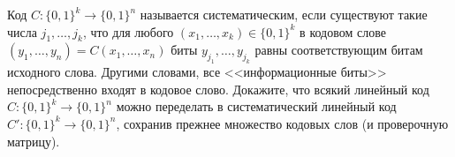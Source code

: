 Код $C: \{0, 1\}^k \rightarrow \{0, 1\}^n$ называется систематическим, если существуют такие числа $j_1, \dots, j_k$, что для
любого $(x_1, \dots, x_k) \in \{0, 1\}^k$ в кодовом слове $(y_1, \dots, y_n) = C(x_1, \dots, x_n)$ биты $y_{j_1}, \dots,
y_{j_k}$ равны соответствующим битам исходного слова. Другими словами, все <<информационные биты>> непосредственно входят в
кодовое слово. Докажите, что всякий линейный код $C: \{0, 1\}^k \rightarrow \{0, 1\}^n$ можно переделать в систематический
линейный код $C': \{0, 1\}^k \rightarrow \{0, 1\}^n$, сохранив прежнее множество кодовых слов (и проверочную матрицу).